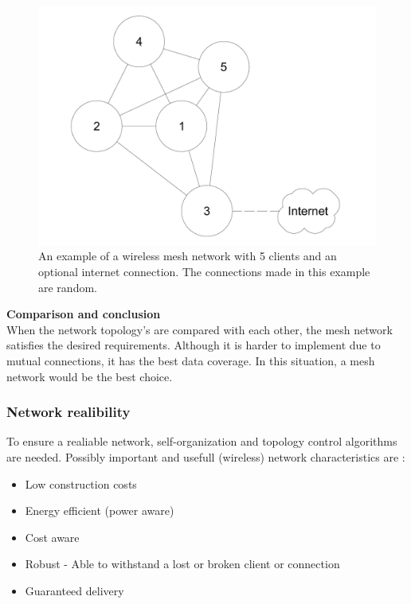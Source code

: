 \documentclass[10pt,a4paper]{article}
\begin{document}
\begin{figure}[H]
   \centering
   \includegraphics[width=1\textwidth]{WMN}
   \caption{An example of a wireless mesh network with 5 clients and an optional internet connection. The connections made in this example are random.}
   \label{fig:WMN}
\end{figure}

\textbf{Comparison and conclusion}\\
When the network topology's are compared with each other, the mesh network satisfies the desired requirements. Although it is harder to implement due to mutual connections, it has the best data coverage. In this situation, a mesh network would be the best choice.

\subsubsection{Network realibility}
To ensure a realiable network, self-organization and topology control algorithms are needed.\cite{WMN1} Possibly important and usefull (wireless) network characteristics are \cite{position-based}:
\begin{itemize}
\setlength\itemsep{0em}
    \item Low construction costs
    \item Energy efficient (power aware)
    \item Cost aware
    \item Robust - Able to withstand a lost or broken client or connection
    \item Guaranteed delivery
\end{itemize}
\end{document}
